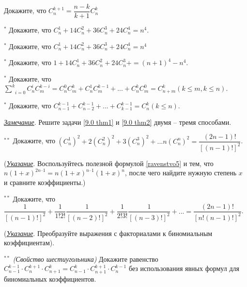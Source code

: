 \begin{thm}
    Докажите, что $C^{k + 1}_n = \dfrac{n - k}{k + 1} C^k_n$
\end{thm}

\begin{thm} $^*$
    Докажите, что $C^1_n + 14C^2_n + 36C^3_n + 24C^4_n = n^4$.
\end{thm}

\begin{thm} $^*$
    Докажите, что $C^1_n + 14C^2_n + 36C^3_n + 24C^4_n = n^4$
\end{thm}

\begin{thm} $^*$
    Докажите, что $1 + 14C^1_n + 36C^2_n + 24C^3_n + = (n + 1)^4 - n^4$.
\end{thm}

\begin{thm} $^*$ \label{9.0 thm1}
    Докажите, что $\underset{i = 0}{\overset{k}\sum} C^i_n C^{k - i}_m =  C^0_n C^k_m + C^1_n C^{k - 1}_m + ... + C^k_n C^0_m = C^k_{n + m} (k \leq m, k \leq n)$.
\end{thm}

\begin{thm} $^*$ \label{9.0 thm2}
    Докажите, что $C^{k - 1}_{n - 1} + C^{k - 1}_{n - 2} + ... + C^{k - 1}_{k - 1} = C^k_n (k \leq n)$.
\end{thm}

\textit{\underline{Замечание}}. Решите задачи \ref{9.0 thm1} и \ref{9.0 thm2} двумя – тремя способами.

\begin{thm} $^{**}$
    Докажите, что $(C^1_n)^2 + 2(C^2_n)^2 + 3(C^3_n)^2 + ... n (C^n_n)^2 = \dfrac{(2n - 1)!}{[(n - 1)!]^2}$.
\end{thm}

(\textit{\underline{Указание}}. Воспользуйтесь полезной формулой \ref{ravenstvo5} и тем, что $n (1 + x)^{2n–1} = n(1 + x)^{n–1} (1 + x)^n$, после чего найдите
нужную степень $x$ и сравните коэффициенты.)

\begin{thm} $^{**}$
    Докажите, что $\dfrac{1}{[(n - 1)!]^2} + \dfrac{1}{1!2!} \dfrac{1}{[(n - 2)!]^2} + \dfrac{1}{2!3!} \dfrac{1}{[(n - 3)!]^2} + ... = \dfrac{(2n - 1)!}{[n!(n - 1)!]^2}$.
\end{thm}

(\textit{\underline{Указание}}. Преобразуйте выражения с факториалами к биномиальным коэффициентам).

\begin{thm} $^{**}$
    \textit{(Свойство шестиугольника)} Докажите равенство $C^{k - 1}_{n - 1} \cdot C^{k + 1}_n \cdot C^k_{n + 1} = C^k_{n - 1} \cdot C^{k + 1}_{n + 1} \cdot C^{k - 1}_n$ без использования явных формул для биномиальных коэффициентов. 
\end{thm}

